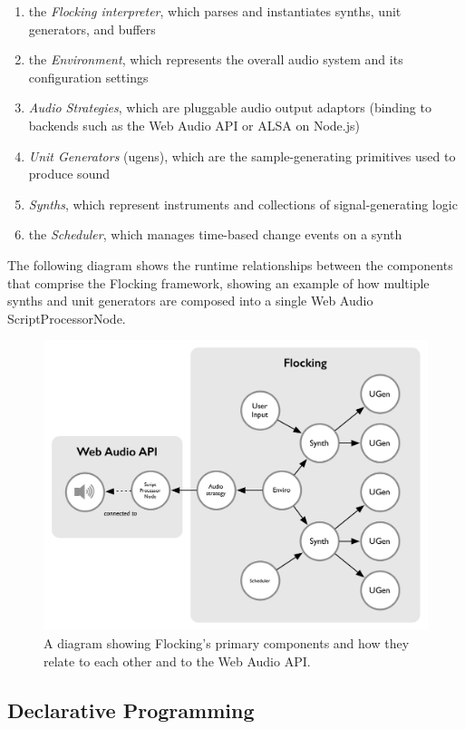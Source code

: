 \documentclass{article}
\begin{document}
\begin{enumerate}
\item the {\it Flocking interpreter}, which parses and instantiates synths, unit generators, and buffers
\item the {\it Environment}, which represents the overall audio system and its configuration settings
\item {\it Audio Strategies}, which are pluggable audio output adaptors (binding to backends such as the Web Audio API or ALSA on Node.js)
\item {\it Unit Generators} (ugens), which are the sample-generating primitives used to produce sound
\item {\it Synths}, which represent instruments and collections of signal-generating logic
\item the {\it Scheduler}, which manages time-based change events on a synth
\end{enumerate}

The following diagram shows the runtime relationships between the components that comprise the Flocking framework, showing an example of how multiple synths and unit generators are composed into a single Web Audio ScriptProcessorNode.

\begin{figure}[h]
\centering
\includegraphics[width=0.9\columnwidth]{images/flocking-component-architecture.png}
\caption{ A diagram showing Flocking's primary components and how they relate to each other and to the Web Audio API.\label{fig:architecture}}
\end{figure}

\subsection{Declarative Programming}
\end{document}
